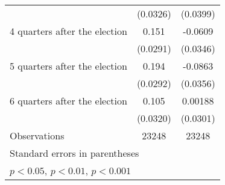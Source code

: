 \begin{table}[htbp]
\begin{tabular}{l*{2}{c}}
                    &    (0.0326)         &    (0.0399)         \\
[1em]
 4 quarters after the election&       0.151\sym{***}&     -0.0609         \\
                    &    (0.0291)         &    (0.0346)         \\
[1em]
 5 quarters after the election&       0.194\sym{***}&     -0.0863\sym{*}  \\
                    &    (0.0292)         &    (0.0356)         \\
[1em]
 6 quarters after the election&       0.105\sym{**} &     0.00188         \\
                    &    (0.0320)         &    (0.0301)         \\
\hline
Observations        &       23248         &       23248         \\
\hline\hline
\multicolumn{3}{l}{\footnotesize Standard errors in parentheses}\\
\multicolumn{3}{l}{\footnotesize \sym{*} \(p<0.05\), \sym{**} \(p<0.01\), \sym{***} \(p<0.001\)}\\
\end{tabular}
\end{table}
